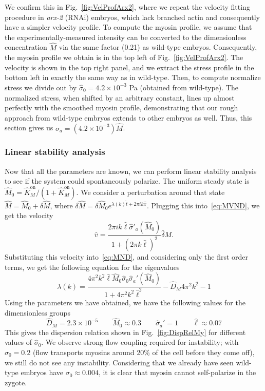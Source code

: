 \documentclass[11pt]{article}
\newcommand{\6}[1]{#1_{\text{6}}}
\newcommand{\3}[1]{#1_{\text{3}}}
\begin{document}
We confirm this in Fig.\ \ref{fig:VelProfArx2}, where we repeat the velocity fitting procedure in \emph{arx-2} (RNAi) embryos, which lack branched actin and consequently have a simpler velocity profile. To compute the myosin profile, we assume that the experimentally-measured intensity can be converted to the dimensionless concentration $\hat M$ via the same factor (0.21) as wild-type embryos. Consequently, the myosin profile we obtain is in the top left of Fig.\ \ref{fig:VelProfArx2}. The velocity is shown in the top right panel, and we extract the stress profile in the bottom left in exactly the same way as in wild-type. Then, to compute normalize stress we divide out by $\hat{\sigma}_0=4.2 \times 10^{-3}$ Pa (obtained from wild-type). The normalized stress, when shifted by an arbitrary constant, lines up almost perfectly with the smoothed myosin profile, demonstrating that our rough approach from wild-type embryos extends to other embryos as well. Thus, this section gives us $\sigma_a = \left(4.2 \times 10^{-3}\right) \hat M$.


\subsubsection{Linear stability analysis \label{sec:StabMy}}
Now that all the parameters are known, we can perform linear stability analysis to see if the system could spontaneously polarize. The uniform steady state is $\hat{M}_0= \hat{K}^\text{on}_M/\left(1+\hat{K}^\text{on}_M\right)$. We consider a perturbation around that state $\hat M=\hat{M}_0+\delta \hat M$, where $\delta \hat M = \delta \hat M_0 e^{\lambda(k) \hat{t}+2 \pi i k \hat{x}}$. Plugging this into\ \eqref{eq:MVND}, we get the velocity \cite[Eq.~(11)]{bois2011pattern}
\begin{equation}
\hat v = \frac{2 \pi i k \hat{\ell} \hat{\sigma}'_a(\hat M_0)}{1 + \left(2 \pi k \hat \ell\right)^2} \hat \delta M. 
\end{equation}
Substituting this velocity into\ \eqref{eq:MND}, and considering only the first order terms, we get the following equation for the eigenvalues
\begin{equation}
\label{eq:DispRel}
\lambda(k) = \frac{4\pi^2 k^2 \hat{\ell} \hat{M}_0 \hat{\sigma}_0 \hat \sigma_a'(\hat{M}_0)}{1+4\pi^2 k^2 \hat{\ell}^2} - \hat{D}_M 4 \pi^2 k^2 -1
\end{equation}
Using the parameters we have obtained, we have the following values for the dimensionless groups
\begin{equation}
\hat{D}_M = 2.3 \times 10^{-5} \qquad \hat{M}_0 \approx 0.3 \qquad \hat \sigma_a'=1 \qquad \hat{\ell} \approx 0.07
\end{equation}
This gives the dispersion relation shown in Fig.\ \ref{fig:DispRelMy} for different values of $\hat{\sigma}_0$. We observe strong flow coupling required for instability; with $\hat{\sigma}_0=0.2$ (flow transports myosins around 20\% of the cell before they come off), we still do not see any instability. Considering that we already have seen wild-type embryos have $\sigma_0 \approx 0.004$, it is clear that myosin cannot self-polarize in the zygote.
\end{document}
